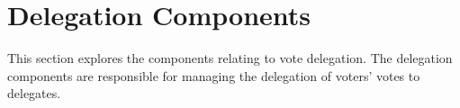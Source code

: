 \section{Delegation Components}

This section explores the components relating to vote delegation. The delegation
components are responsible for managing the delegation of voters' votes to
delegates.



